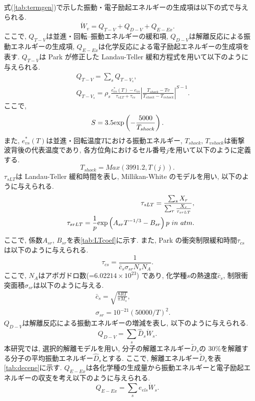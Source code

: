 式(\ref{tab:termgen})で示した振動・電子励起エネルギーの生成項は以下の式で与えられる.
\begin{equation}
{\dot W}_v=Q_{T-V}+Q_{D-V}+Q_{E-Ex}.
\end{equation}
ここで,
$Q_{T-V}$は並進・回転--振動エネルギーの緩和項,
$Q_{D-V}$は解離反応による振動エネルギーの生成項,
$Q_{E-Ex}$は化学反応による電子励起エネルギーの生成項を表す.
$Q_{T-V}$は Park が修正した Landau-Teller 緩和方程式を用いて以下のように与えられる.
\begin{eqnarray}
&&Q_{T-V}=\sum_{s}Q_{{T-V}_s}, \\
&&Q_{{T-V}_s}=\rho_{s}\frac{e^{\ast}_{vs}(T)-e_{vs}}{\tau_{sLT}+\tau_{cs}} \left| \frac{T_{shock}-T{v}}{T_{shock}-T_{vshock}} \right| ^{S-1}.
\end{eqnarray}
ここで,
\begin{equation}
S=3.5{\rm exp} \left( -\frac{5000}{T_{shock}} \right).
\end{equation}
また,
$e^{\ast}_{vs}(T)$は並進・回転温度$T$における振動エネルギー,
$T_{shock}$, $T_{vshock}$は衝撃波背後の代表温度であり,
各方位角におけるセル番号$j$を用いて以下のように定義する.
\begin{equation}
T_{shock}=Max(3991.2,T(j)).
\end{equation}
$\tau_{sLT}$は Landau-Teller 緩和時間を表し,
Millikan-White のモデル\cite{millikan}を用い,
以下のように与えられる.
\begin{eqnarray}
&&\tau_{sLT}=\frac{\sum_{s}X_r}{\sum_{r}\frac{X_r}{\tau_{srLT}}},\\
&&\tau_{srLT}=\frac{1}{p}{\rm exp} \left( A_{sr}T^{-1/3}-B_{sr} \right) p~in~atm.
\end{eqnarray}
ここで,
係数$A_{sr}$, $B_{sr}$を表\ref{tab:LTcoef}に示す.
また,
Park の衝突制限緩和時間$\tau_{cs}$は以下のように与えられる.
\begin{equation}
\tau_{cs}=\frac{1}{{\bar c}_s \sigma_{sr} N_s N_A}.
\end{equation}
ここで,
$N_A$はアボガドロ数(=$6.02214\times10^{23}$)
であり,
化学種$s$の熱速度${\bar c}_s$,
制限衝突面積$\sigma_{sr}$は以下のように与える.
\begin{eqnarray}
&&{\bar c_{s}}=\sqrt{\frac{8RT}{\pi M_{s}}},\\
&&\sigma_{sr}=10^{-21}(50000/T)^2.
\end{eqnarray}
$Q_{D-V}$は解離反応による振動エネルギーの増減を表し,
以下のように与えられる.
\begin{equation}
Q_{D-V}=\sum_{s}{\hat D}_{s}{\dot W}_{s}.
\end{equation}
本研究では,
選択的解離モデルを用い,
分子の解離エネルギー${\tilde D}_{s}$の 30\%を解離する分子の平均振動エネルギー${\hat D}_{s}$とする.
ここで,
解離エネルギー${\tilde D}_{s}$を表\ref{tab:decene}に示す.
$Q_{E-Ex}$は各化学種の生成量から振動エネルギーと電子励起エネルギーの収支を考え以下のように与えられる.
\begin{equation}
Q_{E-Ex}=\sum_{s}e_{els}{\dot W}_{s}.
\end{equation}





